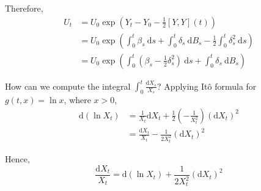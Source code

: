 \begin{example}
    Therefore,
    \begin{equation*}
        \begin{aligned}
            U_t &= U_0 \exp \left( Y_t - Y_0 - \frac{1}{2}[Y, Y](t) \right) \\
                &= U_0 \exp \left( \int_0^t \beta_s~\mathrm{d}s + \int_0^t \delta_s~\mathrm{d}B_s - \frac{1}{2}\int_0^t \delta_s^2~\mathrm{d}s \right) \\
                &= U_0 \exp \left( \int_0^t \left( \beta_s - \frac{1}{2} \delta_s^2 \right)~\mathrm{d}s + \int_0^t \delta_s~\mathrm{d}B_s \right)
        \end{aligned}
    \end{equation*}
\end{example}

\begin{example}
    How can we compute the integral $\int_0^t \frac{\mathrm{d} X_s}{X_s}$? Applying Itô formula for $g(t, x) = \ln x$, where $x > 0$,
    \begin{equation*}\label{eq:log_sde}
        \begin{aligned}
            \mathrm{d}(\ln X_t) &= \frac{1}{X_t} \mathrm{d}X_t + \frac{1}{2} \left( - \frac{1}{X_t^2} \right) (\mathrm{d}X_t)^2 \\
            &= \frac{\mathrm{d} X_t}{X_t} - \frac{1}{2 X_t^2} (\mathrm{d}X_t)^2
        \end{aligned}
    \end{equation*}

    Hence,
    \begin{equation}\label{eq:log_sde_2}
        \frac{\mathrm{d} X_t}{X_t} = \mathrm{d}(\ln X_t) + \frac{1}{2 X_t^2} (\mathrm{d}X_t)^2
    \end{equation}
\end{example}

